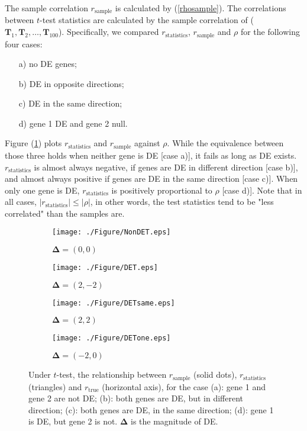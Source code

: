 \documentclass[11pt, a4paper]{article}
\begin{document}
The sample correlation $r_{\text{sample}}$ is calculated by (\ref{rhosample}). The correlations between $t$-test statistics are calculated by the sample correlation of ($\bm T_1, \bm T_2, \ldots, \bm T_{100}$). Specifically, we compared $r_\text{statistics}$, $r_{\text{sample}}$ and $\rho$ for the following four cases:
\begin{enumerate}
	\item[a)] no DE genes;
	\item[b)]  DE in opposite directions;
	\item[c)] DE in the same direction; 
	\item[d)] gene 1 DE and gene 2 null.
\end{enumerate}
Figure (\ref{figureT}) plots $r_\text{statistics}$ and $r_{\text{sample}}$ against $\rho$. While the equivalence between those three holds when neither gene is DE [case a)], it fails as long as DE exists. $r_\text{statistics}$ is almost always negative, if genes are DE in different direction [case b)], and almost always positive if genes are DE in the same direction [case c)]. When only one gene is DE,  $r_\text{statistics}$ is positively proportional to $\rho$ [case d)]. Note that in all cases, $|r_{\text{statistics}}| \leq |\rho|$, in other words, the test statistics tend to be "less correlated" than the samples are.

\begin{figure}[!ht]
	\centering
	\begin{subfigure}{.5\textwidth}
		\centering
		\texttt{[image: ./Figure/NonDET.eps]}
		\captionsetup{justification=centering}
		\caption{$\bm \Delta= (0, 0)$}
	\end{subfigure}%
	\begin{subfigure}{.5\textwidth}
		\centering
		\texttt{[image: ./Figure/DET.eps]}
		\captionsetup{justification=centering}
		\caption{$\bm \Delta= (2, -2)$}
	\end{subfigure}
	\newline
	\newline
	\centering
	\begin{subfigure}{.5\textwidth}
		\centering
		\texttt{[image: ./Figure/DETsame.eps]}
		\captionsetup{justification=centering}
		\caption{$\bm \Delta= (2, 2)$}
	\end{subfigure}%
	\begin{subfigure}{.5\textwidth}
		\centering
		\texttt{[image: ./Figure/DETone.eps]}
		\captionsetup{justification=centering}
		\caption{$\bm \Delta= (-2, 0)$ }
	\end{subfigure}
	\caption{Under $t$-test, the relationship between $r_{\text{sample}}$ (solid dots), $ r_\text{statistics}$ (triangles) and $r_{\text{true}}$ (horizontal axis), for the case (a): gene 1 and gene 2 are not DE; (b): both genes are DE, but in different direction; (c): both genes are DE, in the same direction; (d): gene 1 is DE, but gene 2 is not. $\bm \Delta$ is the magnitude of DE.}
	\label{figureT}
\end{figure}
\end{document}
